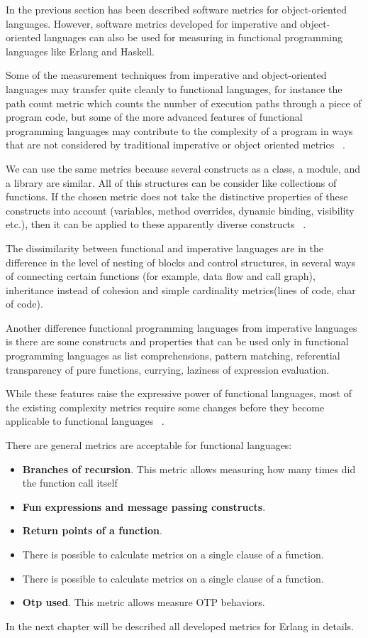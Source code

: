 In the previous section has been described software metrics for object-oriented languages. However, software metrics developed for imperative and object-oriented languages can also be used for measuring in functional programming languages like Erlang and Haskell. 

Some  of  the  measurement  techniques  from  imperative  and object-oriented  languages  may  transfer  quite  cleanly  to  functional  languages,  for  instance  the  path  count  metric  which  counts  the  number  of  execution  paths through  a  piece  of  program  code,  but  some  of  the  more  advanced features  of  functional  programming  languages  may contribute  to  the  complexity  of  a  program  in  ways  that  are  not  considered  by  traditional  imperative  or  object  oriented 
metrics ~\cite{fp}. 

We can use the same metrics because several constructs as a class, a module, and a library are similar. All of this structures can be consider like collections of functions. If the chosen metric does not take the distinctive properties of these constructs into account (variables, method overrides, dynamic binding, visibility etc.), then it can be applied to these apparently diverse constructs ~\cite{metrics3}.

The dissimilarity between functional and imperative languages are in the difference in the level of nesting of blocks and control structures, in several ways of connecting certain functions (for example, data flow and call graph), inheritance instead of cohesion and simple cardinality metrics(lines of code, char of code).

Another difference functional programming languages from imperative languages is there are some constructs and properties that can be used only in functional programming languages as list comprehensions, pattern matching, referential transparency of pure functions, currying, laziness of expression evaluation.

While these features raise the expressive power of functional languages,
most of the existing complexity metrics require some changes before they become applicable to functional languages ~\cite{metrics3}.

There are general metrics are acceptable for functional languages:
\begin{itemize}
	\item \textbf{Branches of recursion}. This metric allows measuring how many times did the function call itself
	\item \textbf{Fun expressions and message passing constructs}.
	\item \textbf{Return points of a function}.
	\item There is possible to calculate metrics on a single clause of a function.
	\item There is possible to calculate metrics on a single clause of a function.
	\item \textbf{Otp used}. This metric allows measure OTP behaviors.
\end{itemize}

In the next chapter will be described all developed metrics for Erlang in details.



